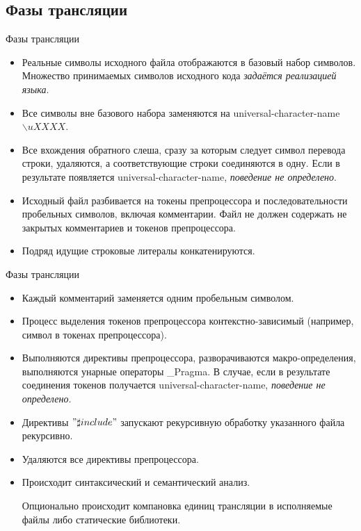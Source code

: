 \documentclass[xetex,mathserif,serif,10pt]{beamer}
\begin{document}
    \subsection{Фазы трансляции}
    \begin{frame}{Фазы трансляции}
        \begin{itemize}
            \item Реальные символы исходного файла отображаются в базовый набор символов.
                Множество принимаемых символов исходного кода \textit{задаётся реализацией языка}.
            \item Все символы вне базового набора заменяются на universal-character-name $\backslash{uXXXX}$.
            \item Все вхождения обратного слеша, сразу за которым следует символ перевода строки,
                удаляются, а соответствующие строки соединяются в одну. Если в результате появляется
                universal-character-name, \textit{поведение не определено}.
            \item Исходный файл разбивается на токены препроцессора и последовательности
                пробельных символов, включая комментарии. Файл не должен содержать не закрытых комментариев и
                токенов препроцессора.
            \item Подряд идущие строковые литералы конкатенируются.
        \end{itemize}
    \end{frame}
    \begin{frame}{Фазы трансляции}
        \begin{itemize}
            \item Каждый комментарий заменяется одним пробельным символом.
            \item Процесс выделения токенов препроцессора контекстно-зависимый (например, символ в токенах препроцессора).
            \item Выполняются директивы препроцессора, разворачиваются макро-определения, выполняются унарные операторы \_Pragma.
                В случае, если в результате соединения токенов получается universal-character-name, \textit{поведение не определено}.
            \item Директивы $"\sharp{include}"$ запускают рекурсивную обработку указанного файла рекурсивно.
            \item Удаляются все директивы препроцессора.
            \item Происходит синтаксический и семантический анализ.
            \item [Опционально] происходит компановка единиц трансляции в исполняемые файлы либо статические библиотеки.
        \end{itemize}
    \end{frame}
\end{document}
